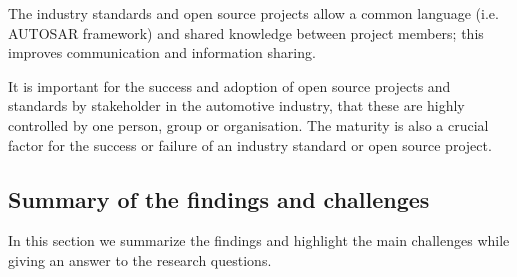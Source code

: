  The industry standards and open source projects allow a common language (i.e. AUTOSAR framework) and shared knowledge between project members; this improves communication and information sharing.

 It is important for the success and adoption of open source projects and standards by stakeholder in the automotive industry, that these are highly controlled by one person, group or organisation. The maturity is also a crucial factor for the success or failure of an industry standard or open source project.



\subsection{Summary of the findings and challenges}\label{sec:findings_RQs}

In this section we summarize the findings and highlight the main challenges while giving an answer to the research questions.

